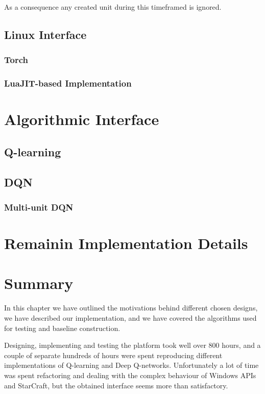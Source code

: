 As a consequence any created unit during this timeframed is ignored.


\subsection{Linux Interface}

\subsubsection{Torch}

\subsubsection{LuaJIT-based Implementation}

\section{Algorithmic Interface}

\subsection{Q-learning}

\subsection{DQN}

\subsubsection{Multi-unit DQN}

\section{Remainin Implementation Details}

\section{Summary}

In this chapter we have outlined the motivations behind different chosen
designs, we have described our implementation, and we have covered the algorithms
used for testing and baseline construction.

Designing, implementing and testing the platform took well over 800 hours, and a
couple of separate hundreds of hours were spent reproducing different
implementations of Q-learning and Deep Q-networks. Unfortunately a lot of time
was spent refactoring and dealing with the complex behaviour of Windows APIs and
StarCraft, but the obtained interface seems more than satisfactory.
